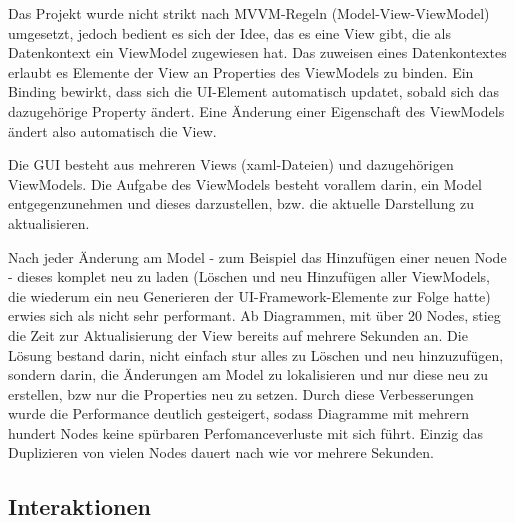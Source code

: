 Das Projekt wurde nicht strikt nach MVVM-Regeln (Model-View-ViewModel) 
umgesetzt, jedoch bedient es sich der Idee, das es eine View gibt, die
als Datenkontext ein ViewModel zugewiesen hat. Das zuweisen eines
Datenkontextes erlaubt es Elemente der View an Properties des ViewModels zu
binden. Ein Binding bewirkt, dass sich die UI-Element automatisch updatet,
sobald sich das dazugehörige Property ändert. Eine Änderung einer
Eigenschaft des ViewModels ändert also automatisch die View.

Die GUI besteht aus mehreren Views (xaml-Dateien) und dazugehörigen ViewModels.
Die Aufgabe des ViewModels besteht vorallem darin, ein Model entgegenzunehmen und dieses
darzustellen, bzw. die aktuelle Darstellung zu aktualisieren.

Nach jeder Änderung am Model - zum Beispiel das Hinzufügen einer neuen
Node -  dieses komplet neu zu laden (Löschen und neu Hinzufügen aller
ViewModels, die wiederum ein neu Generieren der UI-Framework-Elemente zur
Folge hatte) erwies sich als nicht sehr performant. 
Ab Diagrammen, mit über 20 Nodes, stieg die Zeit zur Aktualisierung der View
bereits auf mehrere Sekunden an.
Die Lösung bestand darin, nicht einfach stur alles zu Löschen und neu
hinzuzufügen, sondern darin, die Änderungen am Model zu lokalisieren und nur
diese neu zu erstellen, bzw nur die Properties neu zu setzen. Durch
diese Verbesserungen wurde die Performance deutlich gesteigert, sodass
Diagramme mit mehrern hundert Nodes keine spürbaren Perfomanceverluste mit
sich führt. Einzig das Duplizieren von vielen Nodes dauert nach wie vor
mehrere Sekunden. 

\subsection{Interaktionen}

